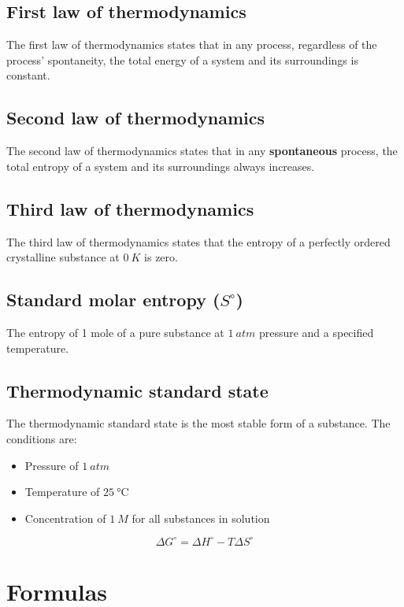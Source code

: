 \documentclass[11pt]{article}
\begin{document}
\subsection{First law of thermodynamics}
\label{sec:orgddea29d}
The first law of thermodynamics states that in any process, regardless of the process' spontaneity, the total energy of a system and its surroundings is constant.

\subsection{Second law of thermodynamics}
\label{sec:org06073a8}
The second law of thermodynamics states that in any \textbf{spontaneous} process, the total entropy of a system and its surroundings always increases.

\subsection{Third law of thermodynamics}
\label{sec:org89c8ea4}
The third law of thermodynamics states that the entropy of a perfectly ordered crystalline substance at \(\qty{0}{\unit{K}}\) is zero.

\subsection{Standard molar entropy (\(S^{\circ}\))}
\label{sec:org78435bd}
The entropy of 1 mole of a pure substance at \(\qty{1}{\unit{atm}}\) pressure and a specified temperature.

\subsection{Thermodynamic standard state}
\label{sec:orgeafbcd8}
The thermodynamic standard state is the most stable form of a substance. The conditions are:
\begin{itemize}
\item Pressure of \(\qty{1}{\unit{atm}}\)
\item Temperature of \(\qty{25}{\unit{\degreeCelsius}}\)
\item Concentration of \(\qty{1}{\unit{M}}\) for all substances in solution
\end{itemize}

\[\Delta G^{\circ} = \Delta H^{\circ} - T \Delta S^{\circ}\]

\newpage

\section{Formulas}
\label{sec:org11020b3}
\end{document}
